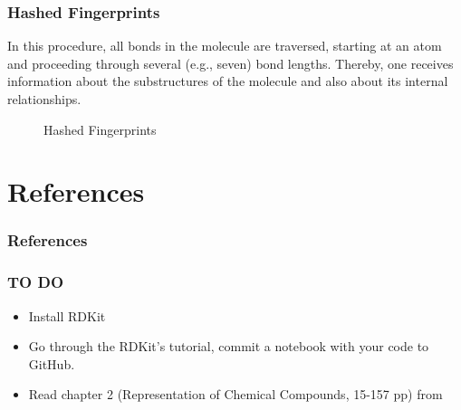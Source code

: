 \documentclass{beamer}
\begin{document}
\begin{frame}
\frametitle{Hashed Fingerprints}
In this procedure, all bonds in the molecule are traversed, starting at an atom and proceeding through several (e.g., seven) bond lengths. Thereby, one receives information about the substructures of the molecule and also about its internal relationships.
\begin{figure}[h!]
\caption{Hashed Fingerprints \cite{smieja2016average}}
\end{figure}
\end{frame}

\section{References}
\begin{frame}
\frametitle{References}
\printbibliography[heading=none]
\end{frame}


\begin{frame}
\frametitle{TO DO}
\begin{itemize}
    \item Install RDKit
    \item Go through the RDKit's tutorial, commit a notebook with your code to GitHub.
    \item Read chapter 2 (Representation of Chemical Compounds, 15-157 pp) from \cite{gasteiger2006chemoinformatics}
\end{itemize}
\end{frame}
\end{document}
